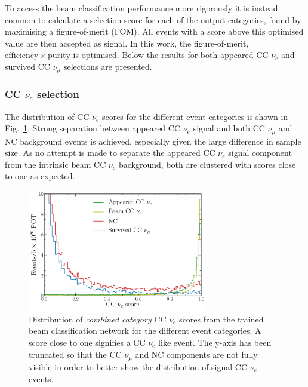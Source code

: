 To access the beam classification performance more rigorously it is instead common to calculate a
selection score for each of the output categories, found by maximising a figure-of-merit (FOM).
All events with a score above this optimised value are then accepted as signal. In this work, the
figure-of-merit, $\mathrm{efficiency}\times\mathrm{purity}$ is optimised. Below the results for
both appeared CC $\nu_{e}$ and survived CC $\nu_{\mu}$ selections are presented.

\subsubsection*{CC $\nu_{e}$ selection} %

The distribution of CC $\nu_{e}$ scores for the different event categories is shown in
Fig.~\ref{fig:final_beam_nuel_outputs}. Strong separation between appeared CC $\nu_{e}$ signal and
both CC $\nu_{\mu}$ and NC background events is achieved, especially given the large difference in
sample size. As no attempt is made to separate the appeared CC $\nu_{e}$ signal component from the
intrinsic beam CC $\nu_{e}$ background, both are clustered with scores close to one as expected.

\begin{figure} %
    \includegraphics[width=0.7\textwidth]{diagrams/6-cvn/chipsnet/final_beam_nuel_outputs.pdf}
    \caption[Distribution of CC $\nu_{e}$ scores from the trained beam classification network.]
    {Distribution of \emph{combined category} CC $\nu_{e}$ scores from the trained beam
        classification network for the different event categories. A score close to one signifies
        a CC $\nu_{e}$ like event. The y-axis has been truncated so that the CC $\nu_{\mu}$ and NC
        components are not fully visible in order to better show the distribution of signal CC
        $\nu_{e}$ events.}
    \label{fig:final_beam_nuel_outputs}
\end{figure}

